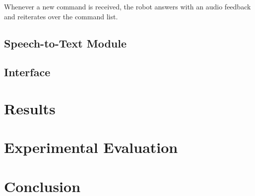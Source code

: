 \documentclass[a4paper, onecolumn, 12pt]{article}
\begin{document}
Whenever a new command is received, the robot answers with an audio feedback and
reiterates over the command list. 


\subsection{Speech-to-Text Module}


\subsection{Interface}


\section{Results}
\label{sec:res}


\section{Experimental Evaluation} 

\section{Conclusion}
\label{sec:con}




\end{document}
